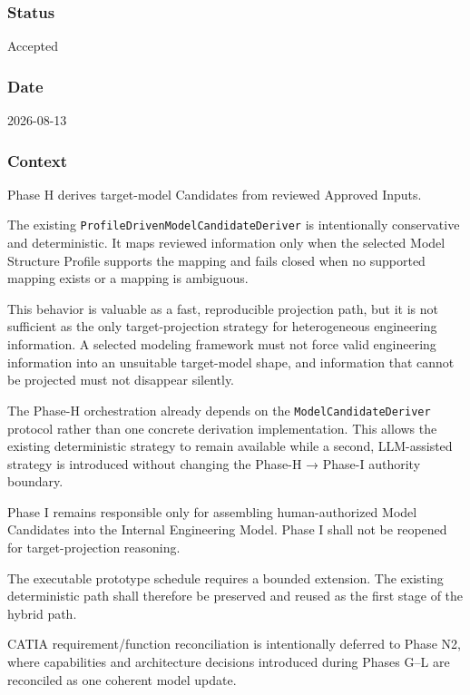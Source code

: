 \hypertarget{status-2}{%
\subsubsection{Status}\label{status-2}}

Accepted

\hypertarget{date-2}{%
\subsubsection{Date}\label{date-2}}

2026-08-13

\hypertarget{context-5}{%
\subsubsection{Context}\label{context-5}}

Phase H derives target-model Candidates from reviewed Approved Inputs.

The existing \texttt{ProfileDrivenModelCandidateDeriver} is intentionally conservative and deterministic. It maps reviewed information only when the selected Model Structure Profile supports the mapping and fails closed when no supported mapping exists or a mapping is ambiguous.

This behavior is valuable as a fast, reproducible projection path, but it is not sufficient as the only target-projection strategy for heterogeneous engineering information. A selected modeling framework must not force valid engineering information into an unsuitable target-model shape, and information that cannot be projected must not disappear silently.

The Phase-H orchestration already depends on the \texttt{ModelCandidateDeriver} protocol rather than one concrete derivation implementation. This allows the existing deterministic strategy to remain available while a second, LLM-assisted strategy is introduced without changing the Phase-H → Phase-I authority boundary.

Phase I remains responsible only for assembling human-authorized Model Candidates into the Internal Engineering Model. Phase I shall not be reopened for target-projection reasoning.

The executable prototype schedule requires a bounded extension. The existing deterministic path shall therefore be preserved and reused as the first stage of the hybrid path.

CATIA requirement/function reconciliation is intentionally deferred to Phase N2, where capabilities and architecture decisions introduced during Phases G--L are reconciled as one coherent model update.

